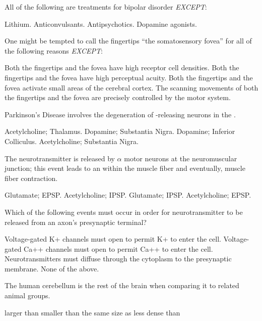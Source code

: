 \documentclass[answers]{exam}
\begin{document}
\begin{questions}
\question All of the following are treatments for bipolar disorder \emph{EXCEPT}:
\begin{choices}
\choice Lithium.
\choice Anticonvulsants.
\choice Antipsychotics.
\correctchoice Dopamine agonists.
\end{choices}

\question One might be tempted to call the fingertips ``the somatosensory fovea'' for all of the following reasons \emph{EXCEPT}:
\begin{choices}
\choice Both the fingertips and the fovea have high receptor cell densities.
\choice Both the fingertips and the fovea have high perceptual acuity.
\correctchoice Both the fingertips and the fovea activate small areas of the cerebral cortex.
\choice The scanning movements of both the fingertips and the fovea are precisely controlled by the motor system.
\end{choices}

\question Parkinson’s Disease involves the degeneration of \fillin -releasing neurons in the \fillin.
\begin{choices}
\choice Acetylcholine; Thalamus.
\correctchoice Dopamine; Substantia Nigra.
\choice Dopamine; Inferior Colliculus.
\choice Acetylcholine; Substantia Nigra.
\end{choices}

\newpage

\question The neurotransmitter \fillin is released by $\alpha$ motor neurons at the neuromuscular junction; this event leads to an \fillin within the muscle fiber and eventually, muscle fiber contraction.
\begin{choices}
\choice Glutamate; EPSP.
\choice Acetylcholine; IPSP.
\choice Glutamate; IPSP.
\correctchoice Acetylcholine; EPSP.
\end{choices}

\question Which of the following events must occur in order for neurotransmitter to be released from an axon's presynaptic terminal?
\begin{choices}
\choice Voltage-gated K+ channels must open to permit K+ to enter the cell.
\correctchoice Voltage-gated Ca++ channels must open to permit Ca++ to enter the cell.
\choice Neurotransmitters must diffuse through the cytoplasm to the presynaptic membrane.
\choice None of the above.
\end{choices}

\question The human cerebellum is \fillin the rest of the brain when comparing it to related animal groups.
\begin{choices}
\choice larger than
\choice smaller than
\correctchoice the same size as
\choice less dense than
\end{choices}


\end{questions}
\end{document}
